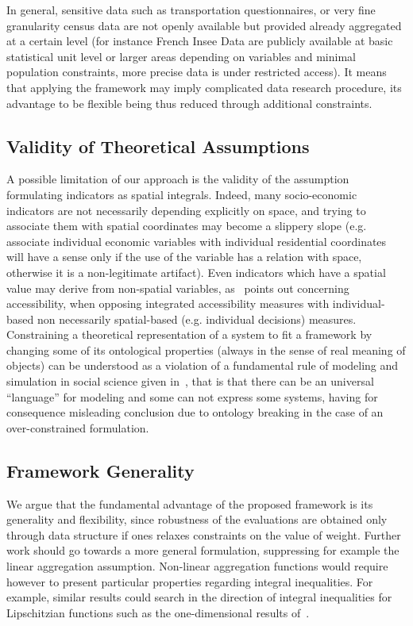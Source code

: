 \documentclass[runningheads,a4paper]{llncs2e/llncs}
\begin{document}
In general, sensitive data such as transportation questionnaires, or very fine granularity census data are not openly available but provided already aggregated at a certain level (for instance French Insee Data are publicly available at basic statistical unit level or larger areas depending on variables and minimal population constraints, more precise data is under restricted access). It means that applying the framework may imply complicated data research procedure, its advantage to be flexible being thus reduced through additional constraints.

\subsection{Validity of Theoretical Assumptions}

A possible limitation of our approach is the validity of the assumption formulating indicators as spatial integrals. Indeed, many socio-economic indicators are not necessarily depending explicitly on space, and trying to associate them with spatial coordinates may become a slippery slope (e.g. associate individual economic variables with individual residential coordinates will have a sense only if the use of the variable has a relation with space, otherwise it is a non-legitimate artifact). Even indicators which have a spatial value may derive from non-spatial variables, as~\cite{kwan1998space} points out concerning accessibility, when opposing integrated accessibility measures with individual-based non necessarily spatial-based (e.g. individual decisions) measures. Constraining a theoretical representation of a system to fit a framework by changing some of its ontological properties (always in the sense of real meaning of objects) can be understood as a violation of a fundamental rule of modeling and simulation in social science given in~\cite{banos2013HDR}, that is that there can be an universal ``language'' for modeling and some can not express some systems, having for consequence misleading conclusion due to ontology breaking in the case of an over-constrained formulation.


\subsection{Framework Generality}

We argue that the fundamental advantage of the proposed framework is its generality and flexibility, since robustness of the evaluations are obtained only through data structure if ones relaxes constraints on the value of weight. Further work should go towards a more general formulation, suppressing for example the linear aggregation assumption. Non-linear aggregation functions would require however to present particular properties regarding integral inequalities. For example, similar results could search in the direction of integral inequalities for Lipschitzian functions such as the one-dimensional results of~\cite{dragomir1999ostrowski}.
\end{document}
